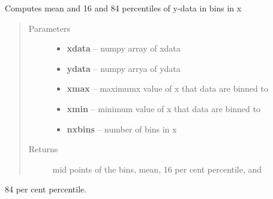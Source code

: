 \documentclass[letterpaper,10pt,english]{sphinxmanual}
\begin{document}
\begin{fulllineitems}
\label{SamPy.astronomy:SamPy.astronomy.datamanipulation.average_bins}
Computes mean and 16 and 84 percentiles of y-data in bins in x
\begin{quote}\begin{description}
\item[{Parameters}] \leavevmode\begin{itemize}
\item {} 
\textbf{xdata} -- numpy array of xdata

\item {} 
\textbf{ydata} -- numpy arrya of ydata

\item {} 
\textbf{xmax} -- maximumx value of x that data are binned to

\item {} 
\textbf{xmin} -- minimum value of x that data are binned to

\item {} 
\textbf{nxbins} -- number of bins in x

\end{itemize}

\item[{Returns}] \leavevmode
mid points of the bins, mean, 16 per cent percentile, and

\end{description}\end{quote}

84 per cent percentile.

\end{fulllineitems}



\begin{fulllineitems}
\label{SamPy.astronomy:SamPy.astronomy.datamanipulation.binAndReturnFractions}
\end{fulllineitems}



\begin{fulllineitems}
\label{SamPy.astronomy:SamPy.astronomy.datamanipulation.binAndReturnMergerFractions}
\end{fulllineitems}
\end{document}
